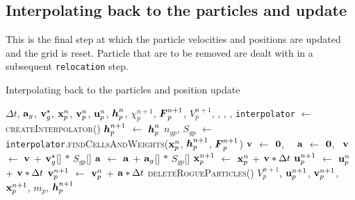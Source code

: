 \subsection{Interpolating back to the particles and update}
This is the final step at which the particle velocities and positions are updated and the grid
is reset.  Particle that are to be removed are dealt with in a subsequent \texttt{relocation} step.
\begin{breakablealgorithm}
  \caption{Interpolating back to the particles and position update}
  \begin{algorithmic}[1]
    \Require $\Delta t$, 
             $\mathbf{a}_g$, $\mathbf{v}_g^\star$, $\mathbf{x}_p^n$, $\mathbf{v}_p^n$, $\mathbf{u}_p^n$, $\boldsymbol{h}_p^n$, $\chi_p^{n+1}$, $\boldsymbol{F}_p^{n+1}$,
             $V_p^{n+1}$,
             , , , 
      \State \texttt{interpolator} $\leftarrow$ \textsc{createInterpolator}()
        \State $\boldsymbol{h}_p^{n+1}$ $\leftarrow$ $\boldsymbol{h}_p^n$
          \State $n_{gp}$, $S_{gp}$ $\leftarrow$ 
            \texttt{interpolator}.\textsc{findCellsAndWeights}($\mathbf{x}_p^n$, $\boldsymbol{h}_p^{n+1}$, $\boldsymbol{F}_p^{n+1}$)
          \State $\mathbf{v}$ $\leftarrow$ $\boldsymbol{0}$,~~ $\mathbf{a}$ $\leftarrow$ $\boldsymbol{0}$,~
            \State $\mathbf{v}$ $\leftarrow$ $\mathbf{v}$ + $\mathbf{v}_g^\star$[\TTnode] $*$ $S_{gp}$[\TTnode]
            \State $\mathbf{a}$ $\leftarrow$ $\mathbf{a}$ + $\mathbf{a}_g$[\TTnode] $*$ $S_{gp}$[\TTnode]
          \EndFor
          \State $\mathbf{x}_p^{n+1}$ $\leftarrow$ $\mathbf{x}_p^n$ + $\mathbf{v} * \Delta t$
          \State $\mathbf{u}_p^{n+1}$ $\leftarrow$ $\mathbf{u}_p^n$ + $\mathbf{v} * \Delta t$
          \State $\mathbf{v}_p^{n+1}$ $\leftarrow$ $\mathbf{v}_p^n$ + $\mathbf{a} * \Delta t$
        \EndFor
      \EndFor
      \State \textsc{deleteRogueParticles}()
      \State \Return $V_p^{n+1}$, $\mathbf{u}_p^{n+1}$, $\mathbf{v}_p^{n+1}$, $\mathbf{x}_p^{n+1}$, $m_p$, $\boldsymbol{h}_p^{n+1}$
    \EndProcedure
  \end{algorithmic}
\end{breakablealgorithm}

\clearpage 
